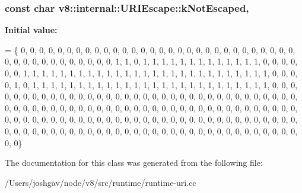 \subsubsection[{\texorpdfstring{k\+Not\+Escaped}{kNotEscaped}}]{\setlength{\rightskip}{0pt plus 5cm}const char v8\+::internal\+::\+U\+R\+I\+Escape\+::k\+Not\+Escaped\hspace{0.3cm}{\ttfamily [static]}, {\ttfamily [private]}}\hypertarget{classv8_1_1internal_1_1_u_r_i_escape_adc1198d0c45bdac3444117376b674d33}{}\label{classv8_1_1internal_1_1_u_r_i_escape_adc1198d0c45bdac3444117376b674d33}
{\bfseries Initial value\+:}
\begin{DoxyCode}
= \{
    0, 0, 0, 0, 0, 0, 0, 0, 0, 0, 0, 0, 0, 0, 0, 0, 0, 0, 0, 0, 0, 0, 0, 0,
    0, 0, 0, 0, 0, 0, 0, 0, 0, 0, 0, 0, 0, 0, 0, 0, 0, 0, 1, 1, 0, 1, 1, 1,
    1, 1, 1, 1, 1, 1, 1, 1, 1, 1, 0, 0, 0, 0, 0, 0, 1, 1, 1, 1, 1, 1, 1, 1,
    1, 1, 1, 1, 1, 1, 1, 1, 1, 1, 1, 1, 1, 1, 1, 1, 1, 1, 1, 0, 0, 0, 0, 1,
    0, 1, 1, 1, 1, 1, 1, 1, 1, 1, 1, 1, 1, 1, 1, 1, 1, 1, 1, 1, 1, 1, 1, 1,
    1, 1, 1, 0, 0, 0, 0, 0, 0, 0, 0, 0, 0, 0, 0, 0, 0, 0, 0, 0, 0, 0, 0, 0,
    0, 0, 0, 0, 0, 0, 0, 0, 0, 0, 0, 0, 0, 0, 0, 0, 0, 0, 0, 0, 0, 0, 0, 0,
    0, 0, 0, 0, 0, 0, 0, 0, 0, 0, 0, 0, 0, 0, 0, 0, 0, 0, 0, 0, 0, 0, 0, 0,
    0, 0, 0, 0, 0, 0, 0, 0, 0, 0, 0, 0, 0, 0, 0, 0, 0, 0, 0, 0, 0, 0, 0, 0,
    0, 0, 0, 0, 0, 0, 0, 0, 0, 0, 0, 0, 0, 0, 0, 0, 0, 0, 0, 0, 0, 0, 0, 0,
    0, 0, 0, 0, 0, 0, 0, 0, 0, 0, 0, 0, 0, 0, 0, 0\}
\end{DoxyCode}


The documentation for this class was generated from the following file\+:\begin{DoxyCompactItemize}
\item 
/\+Users/joshgav/node/v8/src/runtime/runtime-\/uri.\+cc\end{DoxyCompactItemize}
